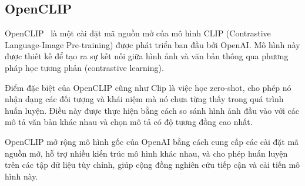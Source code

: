 \subsection{OpenCLIP}
\label{sec:open_clip}


OpenCLIP~\cite{openclip} là một cài đặt mã nguồn mở của mô hình CLIP (Contrastive Language-Image Pre-training) được phát triển ban đầu bởi OpenAI. Mô hình này được thiết kế để tạo ra sự kết nối giữa hình ảnh và văn bản thông qua phương pháp học tương phản (contrastive learning).

    



Điểm đặc biệt của OpenCLIP cũng như Clip là việc học zero-shot, cho phép nó nhận dạng các đối tượng và khái niệm mà nó chưa từng thấy trong quá trình huấn luyện. Điều này được thực hiện bằng cách so sánh hình ảnh đầu vào với các mô tả văn bản khác nhau và chọn mô tả có độ tương đồng cao nhất.

OpenCLIP mở rộng mô hình gốc của OpenAI bằng cách cung cấp các cài đặt mã nguồn mở, hỗ trợ nhiều kiến trúc mô hình khác nhau, và cho phép huấn luyện trên các tập dữ liệu tùy chỉnh, giúp cộng đồng nghiên cứu tiếp cận và cải tiến mô hình này.

